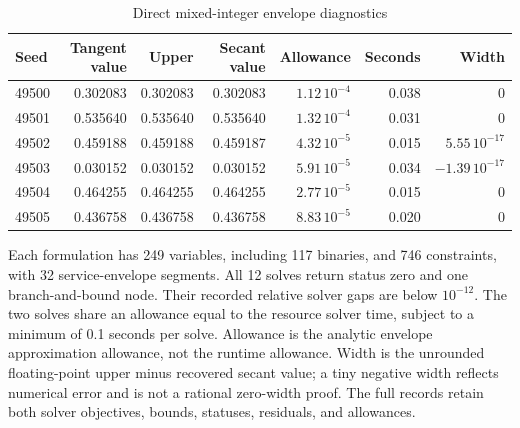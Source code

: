 \begin{table}[p]\centering
\caption{Direct mixed-integer envelope diagnostics}\label{tab:mip52}
\setlength{\tabcolsep}{4pt}
\begin{tabular}{lrrrrrr}
\toprule
Seed & Tangent value & Upper & Secant value & Allowance & Seconds & Width\\
\midrule
49500 & 0.302083 & 0.302083 & 0.302083 & $1.12\,10^{-4}$ & 0.038 & 0\\
49501 & 0.535640 & 0.535640 & 0.535640 & $1.32\,10^{-4}$ & 0.031 & 0\\
49502 & 0.459188 & 0.459188 & 0.459187 & $4.32\,10^{-5}$ & 0.015 & $5.55\,10^{-17}$\\
49503 & 0.030152 & 0.030152 & 0.030152 & $5.91\,10^{-5}$ & 0.034 & $-1.39\,10^{-17}$\\
49504 & 0.464255 & 0.464255 & 0.464255 & $2.77\,10^{-5}$ & 0.015 & 0\\
49505 & 0.436758 & 0.436758 & 0.436758 & $8.83\,10^{-5}$ & 0.020 & 0\\
\bottomrule\end{tabular}
\par\vspace{6pt}\begin{minipage}{\textwidth}Each formulation has 249 variables, including 117 binaries, and 746 constraints, with 32 service-envelope segments. All 12 solves return status zero and one branch-and-bound node. Their recorded relative solver gaps are below $10^{-12}$. The two solves share an allowance equal to the resource solver time, subject to a minimum of 0.1 seconds per solve. Allowance is the analytic envelope approximation allowance, not the runtime allowance. Width is the unrounded floating-point upper minus recovered secant value; a tiny negative width reflects numerical error and is not a rational zero-width proof. The full records retain both solver objectives, bounds, statuses, residuals, and allowances.\end{minipage}
\end{table}

